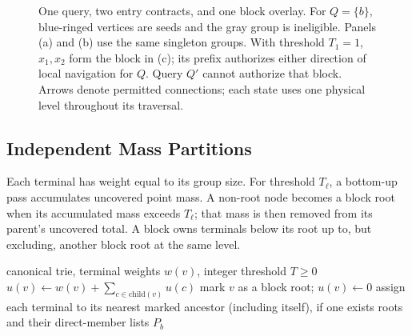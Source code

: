 \begin{figure}[t]
\caption{One query, two entry contracts, and one block overlay. For
$Q=\{b\}$, blue-ringed vertices are seeds and the gray group is ineligible.
Panels (a) and (b) use the same singleton groups. With threshold $T_1=1$,
$x_1,x_2$ form the block in (c); its prefix authorizes either direction of
local navigation for $Q$. Query $Q'$ cannot authorize that block. Arrows denote permitted connections; each state uses one physical
level throughout its traversal.}
\label{fig:method-overview}
\end{figure}

\subsection{Independent Mass Partitions}
Each terminal has weight equal to its group size.  For threshold $T_\ell$,
a bottom-up pass accumulates uncovered point mass.  A non-root node becomes
a block root when its accumulated mass exceeds $T_\ell$; that mass is then
removed from its parent's uncovered total.  A block owns terminals below its
root up to, but excluding, another block root at the same level.

\begin{algorithm}[t]
\caption{One independent block partition}
\label{alg:partition}
\begin{algorithmic}[1]
\Require canonical trie, terminal weights $w(v)$, integer threshold $T\ge0$
  \State $u(v)\gets w(v)+\sum_{c\in\mathrm{child}(v)}u(c)$
    \State mark $v$ as a block root; $u(v)\gets0$
  \EndIf
\EndFor
\State assign each terminal to its nearest marked ancestor (including itself), if one exists
\State \Return roots and their direct-member lists $P_b$
\end{algorithmic}
\end{algorithm}

